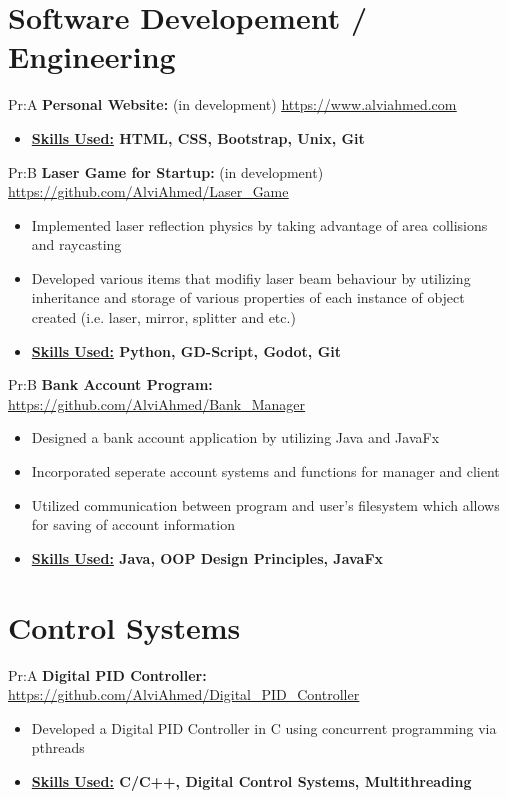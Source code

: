 \section{Software Developement / Engineering}


Pr:A
\textbf{Personal Website: }  (in development) \underline{\url{https://www.alviahmed.com}}
\begin{itemize}[noitemsep,nolistsep]
\item \textbf{\underline{Skills Used:} HTML, CSS, Bootstrap, Unix, Git}
\end{itemize}


Pr:B
\textbf{Laser Game for Startup: } (in development) \underline{\url{https://github.com/AlviAhmed/Laser_Game}}
\begin{itemize}[noitemsep,nolistsep]
\item Implemented laser reflection physics by taking advantage of area collisions and raycasting
\item Developed various items that modifiy laser beam behaviour by utilizing inheritance and storage of
  various properties of each instance of object created (i.e. laser, mirror, splitter and etc.)
\item \textbf{\underline{Skills Used:} Python, GD-Script, Godot, Git}
\end{itemize}


Pr:B
\textbf{Bank Account Program: }
\underline{\url{https://github.com/AlviAhmed/Bank_Manager}}
\begin{itemize}[noitemsep,nolistsep]
\item Designed a bank account application by utilizing Java and JavaFx
\item Incorporated seperate account systems and functions for manager and client 
\item Utilized communication between program and user's filesystem which allows for saving of account information 
\item \textbf{\underline{Skills Used:} Java, OOP Design Principles, JavaFx}
\end{itemize}
\vspace{1em}


\section*{Control Systems}


Pr:A
\vspace{\spaces}
\textbf{Digital PID Controller: } \underline{\url{https://github.com/AlviAhmed/Digital_PID_Controller}}
\begin{itemize}[noitemsep,nolistsep]
\item Developed a Digital PID Controller in C using concurrent programming via pthreads
\item \textbf{ \underline{Skills Used:} C/C++, Digital Control Systems, Multithreading}
\end{itemize}



